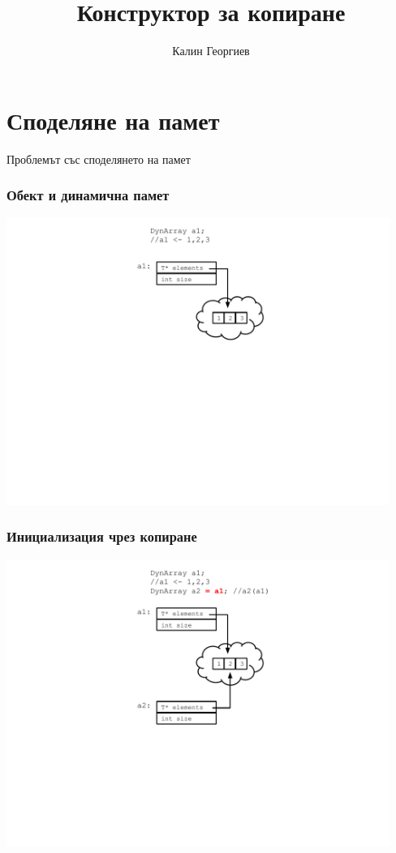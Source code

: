 \documentclass{beamer}
\begin{document}
\title[Обектно ориентирано програмиране]{Конструктор за копиране} 
\author{Калин Георгиев} 
\frame{\titlepage} 

\section{Споделяне на памет} 


\begin{frame}
\centerline{Проблемът със споделянето на памет}
\end{frame}


\begin{frame}[fragile]
\frametitle{Обект и динамична памет}
\includegraphics[width=12.5cm]{images/memshare_01}
\end{frame}

\begin{frame}[fragile]
\frametitle{Инициализация чрез копиране}
\includegraphics[width=12.5cm]{images/memshare_02}
\end{frame}
\end{document}
